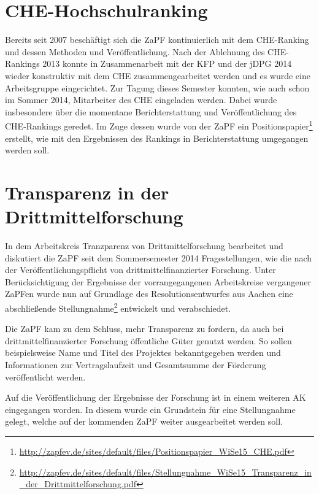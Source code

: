\section*{CHE-Hochschulranking}
Bereits seit 2007 beschäftigt sich die ZaPF kontinuierlich mit dem CHE-Ranking und dessen Methoden und Veröffentlichung. Nach der Ablehnung des CHE-Rankings 2013 konnte in Zusammenarbeit mit der KFP und der jDPG 2014 wieder konstruktiv mit dem CHE zusammengearbeitet werden und es wurde eine Arbeitsgruppe eingerichtet. Zur Tagung dieses Semester konnten, wie auch schon im Sommer 2014, Mitarbeiter des CHE eingeladen werden. Dabei wurde insbesondere über die momentane Berichterstattung und Veröffentlichung des CHE-Rankings geredet. Im Zuge dessen wurde von der ZaPF ein Positionspapier\footnote{\href{http://zapfev.de/sites/default/files/Positionspapier\_WiSe15\_CHE.pdf}{\url{http://zapfev.de/sites/default/files/Positionspapier\_WiSe15\_CHE.pdf}}} erstellt, wie mit den Ergebnissen des Rankings in Berichterstattung umgegangen werden soll.

\section*{Transparenz in der Drittmittelforschung}
In dem Arbeitskreis \glqq{}Tranzparenz von Drittmittelforschung\grqq{} bearbeitet und diskutiert die ZaPF seit dem Sommersemester 2014 Fragestellungen, wie die nach der Veröffentlichungspflicht von drittmittelfinanzierter Forschung. Unter Berücksichtigung der Ergebnisse der vorrangegangenen Arbeitskreise vergangener ZaPFen wurde nun auf Grundlage des Resolutionsentwurfes aus Aachen eine abschließende Stellungnahme\footnote{\href{http://zapfev.de/sites/default/files/Stellungnahme\_WiSe15\_Transparenz\_in\_der\_Drittmittelforschung.pdf}{\url{http://zapfev.de/sites/default/files/Stellungnahme\_WiSe15\_Transparenz\_in\_der\_Drittmittelforschung.pdf}}} entwickelt und verabschiedet.

Die ZaPF kam zu dem Schluss, mehr Transparenz zu fordern, da auch bei drittmittelfinanzierter Forschung öffentliche Güter genutzt werden. So sollen beispielsweise Name und Titel des Projektes bekanntgegeben werden und Informationen zur Vertragslaufzeit und Gesamtsumme der Förderung veröffentlicht werden.

Auf die Veröffentlichung der Ergebnisse der Forschung ist in einem weiteren AK eingegangen worden. In diesem wurde ein Grundstein für eine Stellungnahme gelegt, welche auf der kommenden ZaPF weiter ausgearbeitet werden soll.


